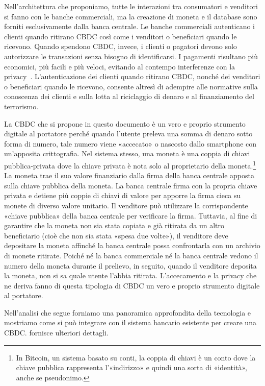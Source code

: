 \documentclass{article}
\begin{document}
Nell'architettura che proponiamo, tutte le interazioni tra consumatori 
e venditori si fanno con le banche commerciali, ma la creazione di moneta 
e il database sono forniti esclusivamente dalla banca centrale. Le banche 
commerciali autenticano i clienti quando ritirano CBDC così come i 
venditori o beneficiari quando le ricevono. Quando spendono CBDC, 
invece, i clienti o pagatori devono solo autorizzare le transazioni senza 
bisogno di identificarsi. I pagamenti risultano più economici, più facili 
e più veloci, evitando al contempo interferenze con la privacy~\cite{Dold}. 
L'autenticazione dei clienti quando ritirano CBDC, nonché dei venditori 
o beneficiari quando le ricevono, consente altresì di adempire alle 
normative sulla conoscenza dei clienti e sulla lotta al riciclaggio di 
denaro e al finanziamento del terrorismo.

La CBDC che si propone in questo documento è un vero e proprio 
strumento digitale al portatore perché quando l'utente preleva una 
somma di denaro sotto forma di numero, tale numero viene «accecato» o 
nascosto dallo smartphone con un'apposita crittografia. Nel sistema 
stesso, una moneta è una coppia di chiavi pubblica-privata dove la 
chiave privata è nota solo al proprietario della moneta.\footnote{In 
Bitcoin, un sistema basato su conti, la coppia di chiavi è un conto 
dove la chiave pubblica rappresenta l'«indirizzo» e quindi una sorta di 
«identità», anche se pseudonimo.} La moneta trae il suo valore 
finanziario dalla firma della banca centrale apposta sulla chiave 
pubblica della moneta. La banca centrale firma con la propria chiave 
privata e detiene più coppie di chiavi di valore per apporre la firma 
cieca su monete di diverso valore unitario. Il venditore può utilizzare 
la corrispondente «chiave pubblica» della banca centrale per verificare 
la firma. Tuttavia, al fine di garantire che la moneta non sia stata 
copiata e già ritirata da un altro beneficiario (cioè che non sia stata 
«spesa due volte»), il venditore deve depositare la moneta affinché la 
banca centrale possa confrontarla con un archivio di monete ritirate. 
Poiché né la banca commerciale né la banca centrale vedono il numero 
della moneta durante il prelievo, in seguito, quando il venditore 
deposita la moneta, non si sa quale utente l'abbia ritirata. L'accecamento 
e la privacy che ne deriva fanno di questa tipologia di CBDC un vero e 
proprio strumento digitale al portatore.

Nell'analisi che segue forniamo una panoramica approfondita della 
tecnologia e mostriamo come si può integrare con il sistema bancario 
esistente per creare una CBDC.  \cite{Dold} fornisce ulteriori 
dettagli.
\end{document}
